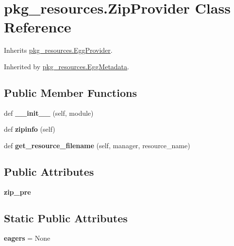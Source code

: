 \hypertarget{classpkg__resources_1_1_zip_provider}{}\section{pkg\+\_\+resources.\+Zip\+Provider Class Reference}
\label{classpkg__resources_1_1_zip_provider}


Inherits \hyperlink{classpkg__resources_1_1_egg_provider}{pkg\+\_\+resources.\+Egg\+Provider}.



Inherited by \hyperlink{classpkg__resources_1_1_egg_metadata}{pkg\+\_\+resources.\+Egg\+Metadata}.

\subsection*{Public Member Functions}
\begin{DoxyCompactItemize}
\item 
\mbox{\label{classpkg__resources_1_1_zip_provider_a8f5abbc9d5949fcbc54f27aff4c06e41}} 
def {\bfseries \+\_\+\+\_\+init\+\_\+\+\_\+} (self, module)
\item 
\mbox{\label{classpkg__resources_1_1_zip_provider_aa90f68344e70df026ca6d233dae858e1}} 
def {\bfseries zipinfo} (self)
\item 
\mbox{\label{classpkg__resources_1_1_zip_provider_afa80d21e26b8d79d8be636f3bfe5d94b}} 
def {\bfseries get\+\_\+resource\+\_\+filename} (self, manager, resource\+\_\+name)
\end{DoxyCompactItemize}
\subsection*{Public Attributes}
\begin{DoxyCompactItemize}
\item 
\mbox{\label{classpkg__resources_1_1_zip_provider_a8c7e07e72f08f590b78a57b55f4b04e8}} 
{\bfseries zip\+\_\+pre}
\end{DoxyCompactItemize}
\subsection*{Static Public Attributes}
\begin{DoxyCompactItemize}
\item 
\mbox{\label{classpkg__resources_1_1_zip_provider_a0887e6dee1cc39873e6c4666423c4b17}} 
{\bfseries eagers} = None
\end{DoxyCompactItemize}


